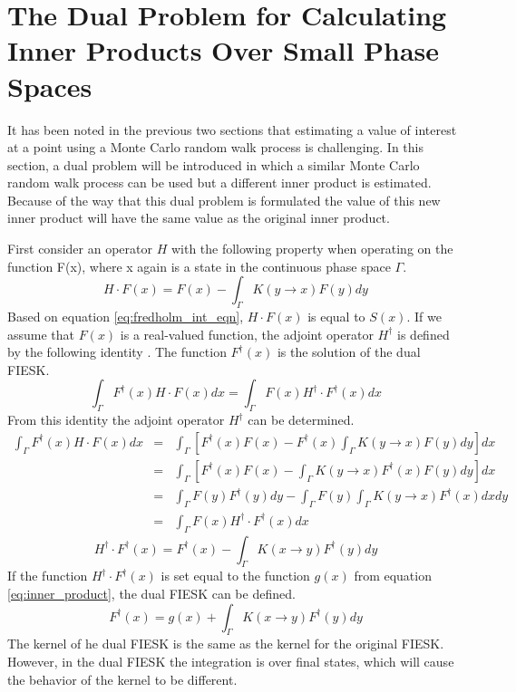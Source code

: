 \section{The Dual Problem for Calculating Inner Products Over Small Phase 
  Spaces}
\label{sec:dual_problems}
It has been noted in the previous two sections that estimating a value of 
interest at a point using a Monte Carlo random walk process is challenging.
In this section, a dual problem will be introduced in which a similar Monte 
Carlo random walk process can be used but a different inner product is 
estimated. Because of the way that this dual problem is formulated the value of 
this new inner product will have the same value as the original inner product. 

First consider an operator $H$ with the following property when operating
on the function F(x), where x again is a state in the continuous phase space
$\Gamma$. 
\begin{equation}
  H \cdot F(x) = F(x) - \int_{\Gamma} K(y \to x)F(y)dy
  \label{eq:forward_operator}
\end{equation}
Based on equation \ref{eq:fredholm_int_eqn}, $H \cdot F(x)$ is equal to $S(x)$.
If we assume that $F(x)$ is a real-valued function, the adjoint operator 
$H^{\dagger}$ is defined by the following identity 
\citep{morse_methods_1953}. The function $F^{\dagger}(x)$ is the solution 
of the dual FIESK. 
\begin{equation}
  \int_{\Gamma}F^{\dagger}(x)H \cdot F(x)dx  = 
  \int_{\Gamma}F(x)H^{\dagger} \cdot F^{\dagger}(x)dx
  \label{eq:forward_adjoint_ops}
\end{equation}
From this identity the adjoint operator $H^{\dagger}$ can be determined.
\begin{eqnarray}
  \int_{\Gamma} F^{\dagger}(x)H \cdot F(x)dx & = & \int_{\Gamma} 
  \left[F^{\dagger}(x)F(x) -
  F^{\dagger}(x)\int_{\Gamma}K(y \to x)F(y)dy \right]dx \nonumber \\
  & = & \int_{\Gamma} \left[F^{\dagger}(x)F(x) -
  \int_{\Gamma}K(y \to x)F^{\dagger}(x)F(y)dy \right]dx \nonumber \\
  & = & \int_{\Gamma} F(y)F^{\dagger}(y)dy - 
  \int_{\Gamma}F(y)\int_{\Gamma}K(y \to x)F^{\dagger}(x)dxdy \nonumber \\
  & = & \int_{\Gamma}F(x)H^{\dagger} \cdot F^{\dagger}(x)dx \nonumber
\end{eqnarray}
\begin{equation}
  H^{\dagger} \cdot F^{\dagger}(x) = F^{\dagger}(x) - 
  \int_{\Gamma}K(x \to y)F^{\dagger}(y)dy
  \label{eq:adjoint_operator}
\end{equation}
If the function $H^{\dagger} \cdot F^{\dagger}(x)$ is set equal to the function
$g(x)$ from equation \ref{eq:inner_product}, the dual FIESK can be defined.
\begin{equation}
  F^{\dagger}(x) = g(x) + \int_{\Gamma}K(x \to y)F^{\dagger}(y)dy 
  \label{eq:dual_fredholm_int_eqn}
\end{equation}
The kernel of he dual FIESK is the same as the kernel for the original FIESK. 
However, in the dual FIESK the integration is over final states, which will 
cause the behavior of the kernel to be different.

